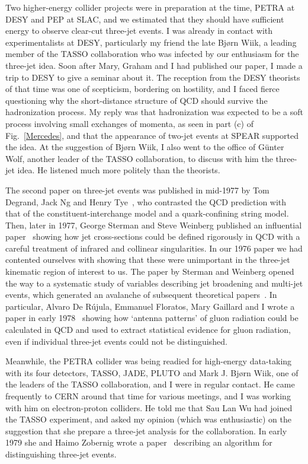 \documentclass{ws-rv975x65}[12pt]
\begin{document}
Two higher-energy collider projects were in preparation at the time,
PETRA at DESY and PEP at SLAC, and we estimated that they should have sufficient energy to
observe clear-cut three-jet events. I was already in contact with experimentalists at DESY, 
particularly my friend the late Bj{\o}rn Wiik,
a leading member of the TASSO collaboration who was infected by our enthusiasm for the three-jet idea.
Soon after Mary, Graham and I had published our paper, I made a trip to DESY to give a seminar about it.
The reception from the DESY theorists of that time was one of scepticism, bordering on hostility,
and I faced fierce questioning why the short-distance structure of QCD should survive the hadronization process.
My reply was that hadronization was expected to be a soft process involving small exchanges of momenta,
as seen in part (c) of Fig.~\ref{Mercedes},
and that the appearance of two-jet events at SPEAR supported the idea.
At the suggestion of Bj{\o}rn Wiik, I also went to the office of G{\" u}nter Wolf,
another leader of the TASSO collaboration, to discuss with him the three-jet idea.
He listened much more politely than the theorists.

The second paper on three-jet events was published in mid-1977 by Tom Degrand, Jack Ng and Henry Tye~\cite{DNT},
who contrasted the QCD prediction with that of the constituent-interchange model and a quark-confining
string model. Then, later in 1977, George Sterman and Steve Weinberg published an influential paper~\cite{SW}
showing how jet cross-sections could be defined rigorously in QCD with a careful treatment of infrared and 
collinear singularities. In our 1976 paper we had contented ourselves with showing that these were 
unimportant in the three-jet kinematic region of interest to us. The paper by Sterman and Weinberg
opened the way to a systematic study of variables describing jet broadening and multi-jet events, 
which generated an avalanche of subsequent theoretical papers~\cite{SphT}. In particular, Alvaro De R{\'u}jula, 
Emmanuel Floratos, Mary Gaillard and I wrote a paper in early 1978~\cite{DEFG} showing how `antenna patterns' of gluon radiation 
could be calculated in QCD and used to extract statistical evidence for gluon radiation, 
even if individual three-jet events could not be distinguished.

Meanwhile, the PETRA collider was being readied for high-energy data-taking with its four detectors, 
TASSO, JADE, PLUTO and Mark J. Bj{\o}rn Wiik, one of the leaders of the TASSO collaboration, and I
were in regular contact. He came frequently to CERN around that time for various meetings,
and I was working with him on electron-proton colliders. He told me that Sau Lan Wu had joined the
TASSO experiment, and asked my opinion (which was enthusiastic) on the suggestion
that she prepare a three-jet analysis for the collaboration. In early 1979 she and Haimo Zobernig
wrote a paper~\cite{WZ} describing an algorithm for distinguishing three-jet events.
\end{document}
